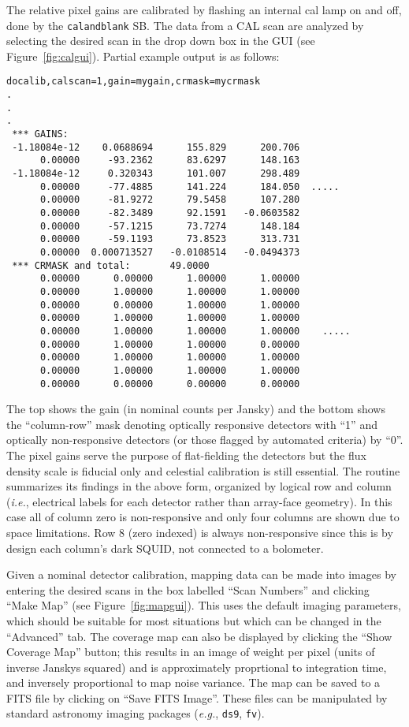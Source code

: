 The relative pixel gains are calibrated by flashing an internal cal lamp on and
off, done by the {\tt calandblank} SB. The data from a CAL scan are analyzed by
selecting the desired scan in the drop down box in the GUI (see Figure~\ref{fig:calgui}).  Partial example output
is as follows:
\begin{lstlisting}
docalib,calscan=1,gain=mygain,crmask=mycrmask
.
.
.
 *** GAINS: 
 -1.18084e-12    0.0688694      155.829      200.706  
      0.00000     -93.2362      83.6297      148.163  
 -1.18084e-12     0.320343      101.007      298.489  
      0.00000     -77.4885      141.224      184.050  .....
      0.00000     -81.9272      79.5458      107.280  
      0.00000     -82.3489      92.1591   -0.0603582  
      0.00000     -57.1215      73.7274      148.184  
      0.00000     -59.1193      73.8523      313.731  
      0.00000  0.000713527   -0.0108514   -0.0494373  
 *** CRMASK and total:       49.0000
      0.00000      0.00000      1.00000      1.00000    
      0.00000      1.00000      1.00000      1.00000    
      0.00000      0.00000      1.00000      1.00000    
      0.00000      1.00000      1.00000      1.00000    
      0.00000      1.00000      1.00000      1.00000    .....
      0.00000      1.00000      1.00000      0.00000    
      0.00000      1.00000      1.00000      1.00000    
      0.00000      1.00000      1.00000      1.00000    
      0.00000      0.00000      0.00000      0.00000    
\end{lstlisting}
The top shows the gain (in nominal counts per Jansky) and the bottom
shows the ``column-row'' mask denoting optically responsive detectors
with ``1'' and optically non-responsive detectors (or those flagged by
automated criteria) by ``0''. The pixel gains serve the purpose of
flat-fielding the detectors but the flux density scale is fiducial
only and celestial calibration is still essential. The routine
summarizes its findings in the above form, organized by logical row
and column ({\it i.e.}, electrical labels for each detector rather
than array-face geometry). In this case all of column zero is
non-responsive and only four columns are shown due to space
limitations.  Row 8 (zero indexed) is always non-responsive since this
is by design each column's dark SQUID, not connected to a bolometer.

Given a nominal detector calibration, mapping data can be made into
images by entering the desired scans in the box labelled ``Scan
Numbers'' and clicking ``Make Map'' (see Figure~\ref{fig:mapgui}).
This uses the default imaging parameters, which should be suitable for
most situations but which can be changed in the ``Advanced'' tab. The
coverage map can also be displayed by clicking the ``Show Coverage
Map'' button; this results in an image of weight per pixel (units of
inverse Janskys squared) and is approximately proprtional to
integration time, and inversely proportional to map noise variance.
The map can be saved to a FITS file by clicking on ``Save FITS
Image''. These files can be manipulated by standard astronomy imaging
packages ({\it e.g.}, {\tt ds9}, {\tt fv}).

